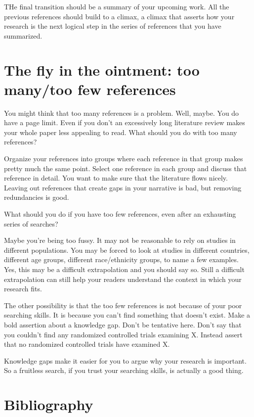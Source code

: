 \documentclass[
  letterpaper,
  DIV=11,
  numbers=noendperiod]{scrreprt}
\begin{document}
\begin{tcolorbox}
THe final transition should be a summary of your upcoming work. All the
previous references should build to a climax, a climax that asserts how
your research is the next logical step in the series of references that
you have summarized.

\section{The fly in the ointment: too many/too few
references}\label{the-fly-in-the-ointment-too-manytoo-few-references}

You might think that too many references is a problem. Well, maybe. You
do have a page limit. Even if you don't an excessively long literature
review makes your whole paper less appealing to read. What should you do
with too many references?

Organize your references into groups where each reference in that group
makes pretty much the same point. Select one reference in each group and
discuss that reference in detail. You want to make sure that the
literature flows nicely. Leaving out references that create gaps in your
narrative is bad, but removing redundancies is good.

What should you do if you have too few references, even after an
exhausting series of searches?

Maybe you're being too fussy. It may not be reasonable to rely on
studies in different populations. You may be forced to look at studies
in different countries, different age groups, different race/ethnicity
groups, to name a few examples. Yes, this may be a difficult
extrapolation and you should say so. Still a difficult extrapolation can
still help your readers understand the context in which your research
fits.

The other possibility is that the too few references is not because of
your poor searching skills. It is because you can't find something that
doesn't exist. Make a bold assertion about a knowledge gap. Don't be
tentative here. Don't say that you couldn't find any randomized
controlled trials examining X. Instead assert that no randomized
controlled trials have examined X.

Knowledge gaps make it easier for you to argue why your research is
important. So a fruitless search, if you trust your searching skills, is
actually a good thing.

\section{Bibliography}\label{bibliography-17}


\end{tcolorbox}
\end{document}
